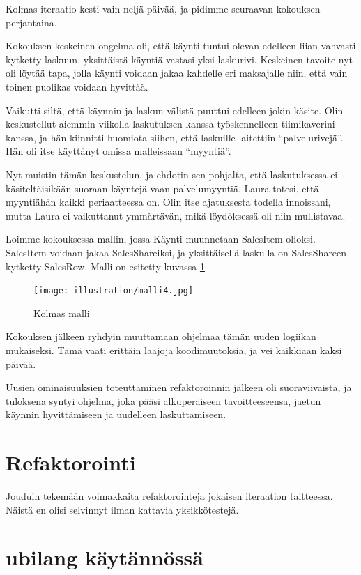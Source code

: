 Kolmas iteraatio kesti vain neljä päivää, ja pidimme seuraavan kokouksen
perjantaina.

Kokouksen keskeinen ongelma oli, että käynti tuntui olevan edelleen
liian vahvasti kytketty laskuun. yksittäistä käyntiä vastasi yksi
laskurivi. Keskeinen tavoite nyt oli löytää tapa, jolla käynti voidaan
jakaa kahdelle eri maksajalle niin, että vain toinen puolikas voidaan
hyvittää.

Vaikutti siltä, että käynnin ja laskun välistä puuttui edelleen jokin
käsite. Olin keskustellut aiemmin viikolla laskutuksen kanssa
työskennelleen tiimikaverini kanssa, ja hän kiinnitti huomiota siihen,
että laskuille laitettiin ``palvelurivejä''. Hän oli itse käyttänyt
omissa malleissaan ``myyntiä''.

Nyt muistin tämän keskustelun, ja ehdotin sen pohjalta, että
laskutuksessa ei käsiteltäisikään suoraan käyntejä vaan palvelumyyntiä.
Laura totesi, että myyntiähän kaikki periaatteessa on. Olin itse
ajatuksesta todella innoissani, mutta Laura ei vaikuttanut ymmärtävän,
mikä löydöksessä oli niin mullistavaa.

Loimme kokouksessa mallin, jossa Käynti muunnetaan SalesItem-olioksi.
SalesItem voidaan jakaa SalesShareiksi, ja yksittäisellä laskulla on
SalesShareen kytketty SalesRow. Malli on esitetty kuvassa \ref{malli3}

\begin{figure}
\centering
\texttt{[image: illustration/malli4.jpg]}
\caption{\label{malli3}Kolmas malli}
\end{figure}

Kokouksen jälkeen ryhdyin muuttamaan ohjelmaa tämän uuden logiikan
mukaiseksi. Tämä vaati erittäin laajoja koodimuutoksia, ja vei kaikkiaan
kaksi päivää.

Uusien ominaisuuksien toteuttaminen refaktoroinnin jälkeen oli
suoraviivaista, ja tuloksena syntyi ohjelma, joka pääsi alkuperäiseen
tavoitteeseensa, jaetun käynnin hyvittämiseen ja uudelleen
laskuttamiseen.

\hypertarget{refaktorointi}{%
\section{Refaktorointi}\label{refaktorointi}}

Jouduin tekemään voimakkaita refaktorointeja jokaisen iteraation
taitteessa. Näistä en olisi selvinnyt ilman kattavia yksikkötestejä.

\hypertarget{kuxe4ytuxe4nnuxf6ssuxe4}{%
\section{\texorpdfstring{\Gls{ubilang}
käytännössä}{ käytännössä}}\label{kuxe4ytuxe4nnuxf6ssuxe4}}

